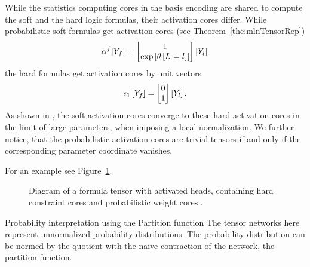 While the statistics computing cores in the basis encoding are shared to compute the soft and the hard logic formulas, their activation cores differ.
While probabilistic soft formulas get activation cores (see Theorem~\ref{the:mlnTensorRep})
\begin{align*}
    \alpha^{f}[Y_{f}]
    = \begin{bmatrix}
          1 \\
          \mathrm{exp}\left[\theta\left[L_{}=l_{}\right]\right]
    \end{bmatrix}[Y_{l}] \,
\end{align*}
the hard formulas get activation cores by unit vectors
\begin{align*}
    \epsilon_1\left[Y_{f}\right]
    = \begin{bmatrix}
          0 \\
          1
    \end{bmatrix}[Y_{l}] \, .
\end{align*}
As shown in , the soft activation cores converge to these hard activation cores in the limit of large parameters, when imposing a local normalization.
%
We further notice, that the probabilistic activation cores are trivial tensors if and only if the corresponding parameter coordinate vanishes.


For an example see Figure~\ref{fig:ActivatedHeads}.

\begin{figure}[h]
    \begin{center}
        
    \end{center}
    \caption{Diagram of a formula tensor with activated heads, containing \textcolor{\concolor}{hard constraint cores} and \textcolor{\probcolor}{probabilistic weight cores} .} %
    \label{fig:ActivatedHeads}
\end{figure}



\begin{remark}{Probability interpretation using the Partition function}
    The tensor networks here represent unnormalized probability distributions.
    The probability distribution can be normed by the quotient with the naive contraction of the network, the partition function.
\end{remark}


